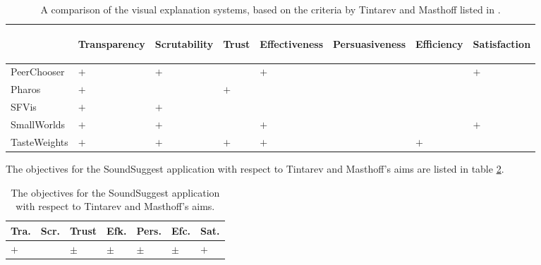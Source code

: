 \begin{center}
	\begin{table}%
	\caption{A comparison of the visual explanation systems, based on the criteria by Tintarev and Masthoff listed in \cite{tintarev:2007:SER:1547550.1547664}.}
		\begin{center}
			\begin{tabular}{l | l l l l l l l }
				\hline
											&	\begin{sideways}Transparency\end{sideways} 
											& \begin{sideways}Scrutability\end{sideways} 
											& \begin{sideways}Trust\end{sideways} 
											& \begin{sideways}Effectiveness\end{sideways} 
											& \begin{sideways}Persuasiveness\end{sideways} 
											& \begin{sideways}Efficiency\end{sideways} 
											& \begin{sideways}Satisfaction\end{sideways}  \\
				\hline
				PeerChooser		&	$+$ 	&	$+$		&				&	$+$		& 	& 			& $+$		\\
				Pharos				&	$+$		&				&	$+$		&				& 	& 			&  			\\
				SFVis					&	$+$ 	&	$+$		&				&				& 	& 			&  			\\
				SmallWorlds		&	$+$		&	$+$		&				&	$+$		& 	& 			& $+$		\\
				TasteWeights	&	$+$		&	$+$		&	$+$		&	$+$		& 	& $+$		&  			\\
				\hline
			\end{tabular}
		\end{center}
		
		\label{table:comparison:criteria}
	\end{table}
\end{center}

The objectives for the SoundSuggest application with respect to Tintarev and Masthoff's aims are listed in table \ref{table:soundsuggest:aims}.

\begin{center}
	\begin{table}%
	\caption{The objectives for the SoundSuggest application with respect to Tintarev and Masthoff's aims.}
		\begin{center}
			\begin{tabular}{l l l l l l l }
				\hline
				Tra. & Scr. & Trust & Efk. & Pers. & Efc. & Sat.  \\
				\hline
				$+$ &		&	$\pm$	&	$\pm$	& $\pm$	& $\pm$	& $+$	\\
				\hline
			\end{tabular}
		\end{center}
		\label{table:soundsuggest:aims}
	\end{table}
\end{center}



